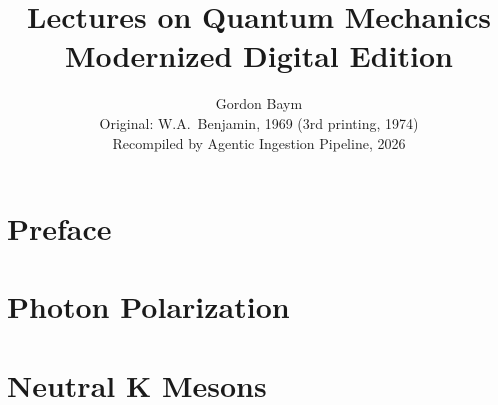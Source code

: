 \documentclass[11pt,twoside,openright]{book}
\title{\textbf{Lectures on Quantum Mechanics}\\[0.5em]
       \large Modernized Digital Edition}
\author{Gordon Baym\\[0.3em]
        \small Original: W.A.\ Benjamin, 1969 (3rd printing, 1974)\\
        \small Recompiled by Agentic Ingestion Pipeline, 2026}
\date{}
\begin{document}
\frontmatter
\maketitle
\tableofcontents
\mainmatter

\chapter*{Preface}



\chapter{Photon Polarization}







\chapter{Neutral K Mesons}



\end{document}
